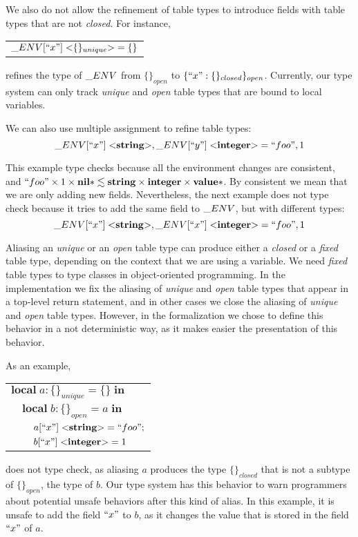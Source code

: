 \documentclass{sigplanconf}
\newcommand{\Value}{\mathbf{value}}
\newcommand{\Nil}{\mathbf{nil}}
\newcommand{\Integer}{\mathbf{integer}}
\newcommand{\String}{\mathbf{string}}
\begin{document}
We also do not allow the refinement of table types to introduce
fields with table types that are not \emph{closed}.
For instance,
\begin{center}
\begin{tabular}{l}
$\string_ENV[``x"] \; {<}\{\}_{unique}{>} = \{\}$
\end{tabular}
\end{center}
refines the type of $\string_ENV$ from $\{\}_{open}$ to $\{``x":\{\}_{closed}\}_{open}$.
Currently, our type system can only track \emph{unique} and
\emph{open} table types that are bound to local variables.

We can also use multiple assignment to refine table types:
\[
\string_ENV[``x"] \; {<}\String{>}, \string_ENV[``y"] \; {<}\Integer{>} = ``foo", 1
\]

This example type checks because all the environment changes are consistent, and
$``foo" \times 1 \times \Nil{*} \lesssim \String \times \Integer \times \Value{*}$.
By consistent we mean that we are only adding new fields.
Nevertheless, the next example does not type check because it tries to add
the same field to $\string_ENV$, but with different types:
\[
\string_ENV[``x"] \; {<}\String{>}, \string_ENV[``x"] \; {<}\Integer{>} = ``foo", 1
\]

Aliasing an \emph{unique} or an \emph{open} table type can produce
either a \emph{closed} or a \emph{fixed} table type, depending on
the context that we are using a variable.
We need \emph{fixed} table types to type classes in object-oriented programming.
In the implementation we fix the aliasing of \emph{unique} and \emph{open}
table types that appear in a top-level return statement, and in other cases we
close the aliasing of \emph{unique} and \emph{open} table types.
However, in the formalization we chose to define this behavior in
a not deterministic way, as it makes easier the presentation of this behavior.

As an example,
\begin{center}
\begin{tabular}{lll}
\multicolumn{3}{l}{$\mathbf{local} \; a:\{\}_{unique} = \{\} \; \mathbf{in}$}\\
& \multicolumn{2}{l}{$\mathbf{local} \; b:\{\}_{open} = a \; \mathbf{in}$}\\
& & \multicolumn{1}{l}{$a[``x"] \; {<}\String{>} = ``foo";$}\\
& & \multicolumn{1}{l}{$b[``x"] \; {<}\Integer{>} = 1$}\\
\end{tabular}
\end{center}
does not type check, as aliasing $a$ produces the type $\{\}_{closed}$
that is not a subtype of $\{\}_{open}$, the type of $b$.
Our type system has this behavior to warn programmers about
potential unsafe behaviors after this kind of alias.
In this example, it is unsafe to add the field $``x"$ to $b$,
as it changes the value that is stored in the field $``x"$ of $a$.
\end{document}
